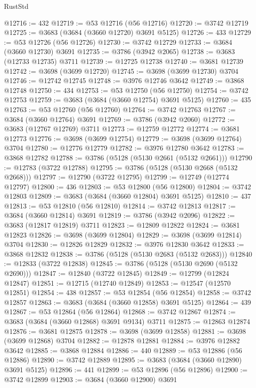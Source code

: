 \begin{lexlean}{RustStd}
\begin{coremodule}
{\begin{coremodule}
{{{{{{{{{{{{{{{{{{{{{{{{{{{{{{{{{{{{{{{{{{{{{{{@12716 := 432
@12719 := @53 @12716 (@56 @12716)
@12720 := @3742 @12719
@12725 := @3683 (@3684 (@3660 @12720) @3691 @5125)
@12726 := 433
@12729 := @53 @12726 (@56 @12726)
@12730 := @3742 @12729
@12733 := @3684 (@3660 @12730) @3691
@12735 := @3786 (@3942 @2065)
@12738 := @3683 (@12733 @12735) @3711
@12739 := @12725 @12738
@12740 := @3681 @12739
@12742 := @3698 (@3699 @12720)
@12745 := @3698 (@3699 @12730) @3704
@12746 := @12742 @12745
@12748 := @3976 @12746 @3642
@12749 := @3868 @12748
@12750 := 434
@12753 := @53 @12750 (@56 @12750)
@12754 := @3742 @12753
@12759 := @3683 (@3684 (@3660 @12754) @3691 @5125)
@12760 := 435
@12763 := @53 @12760 (@56 @12760)
@12764 := @3742 @12763
@12767 := @3684 (@3660 @12764) @3691
@12769 := @3786 (@3942 @2060)
@12772 := @3683 (@12767 @12769) @3711
@12773 := @12759 @12772
@12774 := @3681 @12773
@12776 := @3698 (@3699 @12754)
@12779 := @3698 (@3699 @12764) @3704
@12780 := @12776 @12779
@12782 := @3976 @12780 @3642
@12783 := @3868 @12782
@12788 := @3786 (@5128 (@5130 @2661 (@5132 @2661)))
@12790 := @12783 (@3722 @12788)
@12795 := @3786 (@5128 (@5130 @2668 (@5132 @2668)))
@12797 := @12790 (@3722 @12795)
@12799 := @12749 (@12774 @12797)
@12800 := 436
@12803 := @53 @12800 (@56 @12800)
@12804 := @3742 @12803
@12809 := @3683 (@3684 (@3660 @12804) @3691 @5125)
@12810 := 437
@12813 := @53 @12810 (@56 @12810)
@12814 := @3742 @12813
@12817 := @3684 (@3660 @12814) @3691
@12819 := @3786 (@3942 @2096)
@12822 := @3683 (@12817 @12819) @3711
@12823 := @12809 @12822
@12824 := @3681 @12823
@12826 := @3698 (@3699 @12804)
@12829 := @3698 (@3699 @12814) @3704
@12830 := @12826 @12829
@12832 := @3976 @12830 @3642
@12833 := @3868 @12832
@12838 := @3786 (@5128 (@5130 @2683 (@5132 @2683)))
@12840 := @12833 (@3722 @12838)
@12845 := @3786 (@5128 (@5130 @2690 (@5132 @2690)))
@12847 := @12840 (@3722 @12845)
@12849 := @12799 (@12824 @12847)
@12851 := @12715 (@12740 @12849)
@12853 := @12547 (@12570 @12851)
@12854 := 438
@12857 := @53 @12854 (@56 @12854)
@12858 := @3742 @12857
@12863 := @3683 (@3684 (@3660 @12858) @3691 @5125)
@12864 := 439
@12867 := @53 @12864 (@56 @12864)
@12868 := @3742 @12867
@12874 := @3683 (@3684 (@3660 @12868) @3691 @9134) @3711
@12875 := @12863 @12874
@12876 := @3681 @12875
@12878 := @3698 (@3699 @12858)
@12881 := @3698 (@3699 @12868) @3704
@12882 := @12878 @12881
@12884 := @3976 @12882 @3642
@12885 := @3868 @12884
@12886 := 440
@12889 := @53 @12886 (@56 @12886)
@12890 := @3742 @12889
@12895 := @3683 (@3684 (@3660 @12890) @3691 @5125)
@12896 := 441
@12899 := @53 @12896 (@56 @12896)
@12900 := @3742 @12899
@12903 := @3684 (@3660 @12900) @3691
}}}}}}}}}}}}}}}}}}}}}}}}}}}}}}}}}}}}}}}}}}}}}}}
\end{coremodule}}
\end{coremodule}
\end{lexlean}
